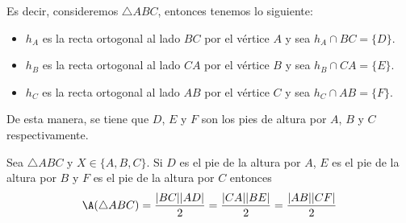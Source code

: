 Es decir, consideremos $\triangle ABC$, entonces tenemos lo siguiente:
\begin{itemize}
\item $h_{A}$ es la recta ortogonal al lado $BC$ por el vértice $A$ y sea $h_{A}\cap BC=\{D\}$.
\item $h_{B}$ es la recta ortogonal al lado $CA$ por el vértice $B$ y sea $h_{B}\cap CA=\{E\}$.
\item $h_{C}$ es la recta ortogonal al lado $AB$ por el vértice $C$ y sea $h_{C}\cap AB=\{F\}$.
\end{itemize}
De esta manera, se tiene que $D$, $E$ y $F$ son los pies de altura por $A$, $B$ y $C$ respectivamente.

\begin{prop} \label{prop2}
Sea $\triangle ABC$ y $X \in \{A,B,C\}$. Si $D$ es el pie de la altura por $A$, $E$ es el pie de la altura por $B$ y $F$ es el pie de la altura por $C$ entonces
$$\A(\triangle ABC) = \frac{|BC||AD|}{2}= \frac{|CA||BE|}{2} = \frac{|AB||CF|}{2} $$
\end{prop}


